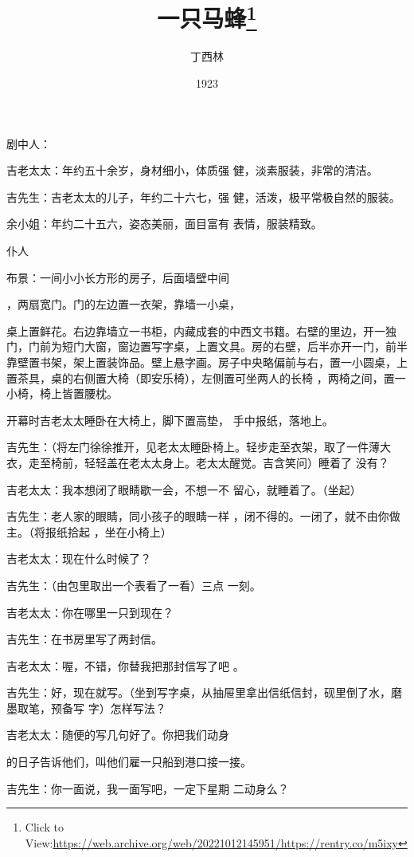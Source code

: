 \documentclass{article}
\title{一只马蜂\footnote{Click to View:\url{https://web.archive.org/web/20221012145951/https://rentry.co/m5ixy}}}
\author{丁西林}
\date{1923}
\begin{document}

\maketitle


\Large


﻿剧中人： 

吉老太太：年约五十余岁，身材细小，体质强
健，淡素服装，非常的清洁。 

吉先生：吉老太太的儿子，年约二十六七，强
健，活泼，极平常极自然的服装。 

余小姐：年约二十五六，姿态美丽，面目富有
表情，服装精致。 


仆人 

布景：一间小小长方形的房子，后面墙壁中间

\newpage
，两扇宽门。门的左边置一衣架，靠墙一小桌， 

桌上置鲜花。右边靠墙立一书柜，内藏成套的中西文书籍。右壁的里边，开一独门，门前为短门大窗，窗边置写字桌，上置文具。房的右壁，后半亦开一门，前半靠壁置书架，架上置装饰品。壁上悬字画。房子中央略偏前与右，置一小圆桌，上置茶具，桌的右侧置大椅（即安乐椅），左侧置可坐两人的长椅
，两椅之间，置一小椅，椅上皆置腰枕。 

开幕时吉老太太睡卧在大椅上，脚下置高垫，
手中报纸，落地上。 

吉先生：（将左门徐徐推开，见老太太睡卧椅上。轻步走至衣架，取了一件薄大衣，走至椅前，轻轻盖在老太太身上。老太太醒觉。吉含笑问）睡着了
没有？ 

吉老太太：我本想闭了眼睛歇一会，不想一不
留心，就睡着了。（坐起） 

吉先生：老人家的眼睛，同小孩子的眼睛一样
\newpage
，闭不得的。一闭了，就不由你做主。（将报纸拾起
，坐在小椅上） 


吉老太太：现在什么时候了？ 

吉先生：（由包里取出一个表看了一看）三点
一刻。 


吉老太太：你在哪里一只到现在？ 


吉先生：在书房里写了两封信。 

吉老太太：喔，不错，你替我把那封信写了吧
。 

吉先生：好，现在就写。（坐到写字桌，从抽屉里拿出信纸信封，砚里倒了水，磨墨取笔，预备写
字）怎样写法？ 

吉老太太：随便的写几句好了。你把我们动身

\newpage
的日子告诉他们，叫他们雇一只船到港口接一接。 

吉先生：你一面说，我一面写吧，一定下星期
二动身么？ 
\end{document}
